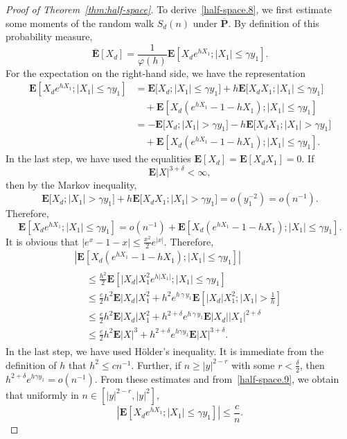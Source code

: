 \documentclass[10pt]{amsart}
\theoremstyle{definition}\newtheorem{defi}[theo]{Definition}\newtheorem{rema}[theo]{Remark}\newtheorem{exam}[theo]{Example}\newtheorem{exem}[theo]{Example}\newtheorem{nota}[theo]{Notation}
\newcommand{\pr}{\mathbf{P}}
\newcommand{\e}{\mathbf{E}}
\renewcommand{\le}{\leqslant}
\renewcommand{\ge}{\geqslant}
\begin{document}
\begin{proof}[Proof of Theorem~\ref{thm:half-space}]
To derive~\eqref{half-space.8}, we first estimate some moments of the random walk $S_d(n)$ under $\overline{\pr}$. By definition of this probability measure,
\[
\overline{\e}\left[X_d\right]=\frac{1}{\varphi(h)}\e\left[X_de^{hX_1};\left| X_1\right|\le \gamma y_1\right].
\]
For the expectation on the right-hand side, we have the representation
\begin{align*}
\e\left[X_de^{hX_1};|X_1|\le \gamma y_1\right]
&=\e\big[X_d;|X_1|\le \gamma y_1\big]+h\e\big[X_dX_1;|X_1|\le \gamma y_1\big]
\\
&\quad+\e\left[X_d\left(e^{hX_1}-1-hX_1\right);|X_1|\le \gamma y_1\right]\\
&=-\e\big[X_d;|X_1|> \gamma y_1\big]-h\e\big[X_dX_1;|X_1|> \gamma y_1\big]\\
&\quad+\e\left[X_d\left(e^{hX_1}-1-hX_1\right);|X_1|\le \gamma y_1\right].
\end{align*}
In the last step, we have used the equalities $\e[X_d]=\e[X_dX_1]=0$. If
\begin{equation}\label{half-space.9}
\e| X|^{3+\delta}<\infty,
\end{equation}
then by the Markov inequality,
\[
\e\big[X_d;|X_1|> \gamma y_1\big]+h\e\big[X_dX_1;|X_1|> \gamma y_1\big] =o\left(y_1^{-2}\right)=o\left(n^{-1}\right).
\]
Therefore,
\[
\e\left[X_de^{hX_1};|X_1|\le \gamma y_1\right]=o\left(n^{-1}\right)+
\e\left[X_d\left(e^{hX_1}-1-hX_1\right);|X_1|\le \gamma y_1\right].
\]
It is obvious that $|e^x-1-x|\le \frac{x^2}{2}e^{| x|}$. Therefore,
\begin{multline*}
\left|\e\left[X_d\left(e^{hX_1}-1-hX_1\right);|X_1|\le \gamma y_1\right]\right|\\
\begin{aligned}
&\le \frac{h^2}{2}\e\left[|X_d| X_1^2e^{h|X_1|};|X_1|\le\gamma y_1\right]\\
&\le \frac{e}{2}h^2\e|X_d| X_1^2+h^2e^{h\,\gamma\,y_1}\e\left[|X_d| X_1^2;|X_1|>\frac{1}{h}\right]\\
&\le \frac{e}{2}h^2\e|X_d| X_1^2+h^{2+\delta}e^{h\,\gamma\,y_1}\e|X_d| |X_1|^{2+\delta}\\
&\le \frac{e}{2}h^2\e|X|^3 + h^{2+\delta}e^{h\gamma y_1}\e|X|^{3+\delta}.
\end{aligned}
\end{multline*}
In the last step, we have used H\"older's inequality. It is immediate from the definition of $h$ that $h^2\le cn^{-1}$. Further, if $n\ge| y|^{2-r}$ with some $r<\frac{\delta}{2}$, then $h^{2+\delta}e^{h\gamma y_1}=o(n^{-1})$. From these estimates and from~\eqref{half-space.9}, we obtain that uniformly in $n\in[| y|^{2-r},| y|^2]$,
\begin{equation}\label{half-space.10}
\left|\e\left[X_de^{hX_1};|X_1|\le \gamma y_1\right]\right|\le\frac{c}{n}.
\end{equation}



\end{proof}
\end{document}
